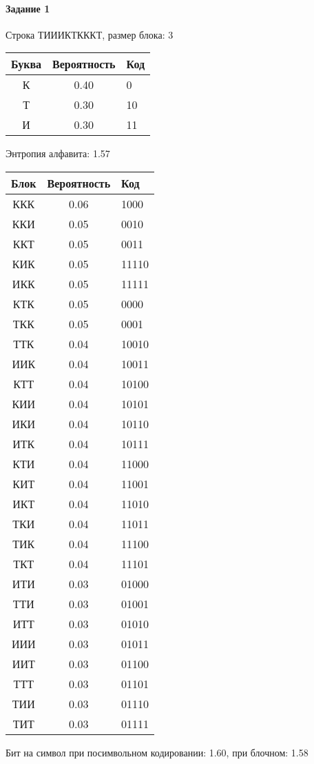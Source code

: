 \documentclass[a4paper, 12pt]{article}
\begin{document}
\paragraph{Задание 1}

Строка ТИИИКТКККТ, размер блока: 3
\begin{center}
 \begin{tabular}{ |c|c|l| } 
  \hline
     Буква & Вероятность & Код\\ \hline
К & 0.40 & 0\\\hline
Т & 0.30 & 10\\\hline
И & 0.30 & 11
\\ \hline \end{tabular}
\end{center}
Энтропия алфавита: 1.57
\begin{center}
 \begin{tabular}{ |c|c|l| } 
  \hline
     Блок & Вероятность & Код\\ \hline
ККК & 0.06 & 1000\\\hline
ККИ & 0.05 & 0010\\\hline
ККТ & 0.05 & 0011\\\hline
КИК & 0.05 & 11110\\\hline
ИКК & 0.05 & 11111\\\hline
КТК & 0.05 & 0000\\\hline
ТКК & 0.05 & 0001\\\hline
ТТК & 0.04 & 10010\\\hline
ИИК & 0.04 & 10011\\\hline
КТТ & 0.04 & 10100\\\hline
КИИ & 0.04 & 10101\\\hline
ИКИ & 0.04 & 10110\\\hline
ИТК & 0.04 & 10111\\\hline
КТИ & 0.04 & 11000\\\hline
КИТ & 0.04 & 11001\\\hline
ИКТ & 0.04 & 11010\\\hline
ТКИ & 0.04 & 11011\\\hline
ТИК & 0.04 & 11100\\\hline
ТКТ & 0.04 & 11101\\\hline
ИТИ & 0.03 & 01000\\\hline
ТТИ & 0.03 & 01001\\\hline
ИТТ & 0.03 & 01010\\\hline
ИИИ & 0.03 & 01011\\\hline
ИИТ & 0.03 & 01100\\\hline
ТТТ & 0.03 & 01101\\\hline
ТИИ & 0.03 & 01110\\\hline
ТИТ & 0.03 & 01111
\\ \hline \end{tabular}
\end{center}
Бит на символ при посимвольном кодировании: 1.60, при блочном: 1.58
\end{document}
